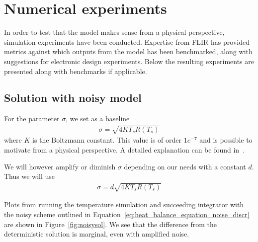 \section{Numerical experiments}

In order to test that the model makes sense from a physical
perspective, simulation experiments have been conducted. Expertise
from FLIR has provided metrics against which outputs from the model
has been benchmarked, along with suggestions for electronic design
experiments. Below the resulting experiments are presented along with
benchmarks if applicable.


\subsection{Solution with noisy model}
For the parameter $\sigma$, we set as a baseline
\begin{align}
\sigma = \sqrt{4KT_sR(T_s)}
\end{align}
where  $K$ is the Boltzmann constant. This value is of order $1e^{-7}$
and is possible to motivate from a physical perspective. A detailed
explanation can be found in~\cite{WOOD199743}.

We will however amplify or diminish $\sigma$ depending on our needs
with a constant $d$. Thus we will use
\begin{align}
\sigma = d \sqrt{4KT_sR(T_s)}
\end{align}

Plots from running the temperature simulation and succeeding
integrator with the noisy scheme outlined in
Equation~\eqref{eq:heat_balance_equation_noise_discr} are shown
in Figure~\ref{fig:noisysol}. We see that the difference from the
deterministic solution is marginal, even with amplified noise.

